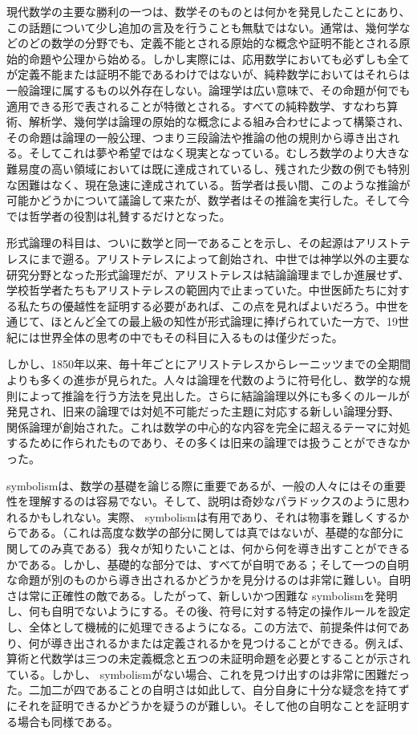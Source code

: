 \documentclass[a4paper,11pt,openany]{ltjsbook}
\begin{document}
現代数学の主要な勝利の一つは、数学そのものとは何かを発見したことにあり、この話題について少し追加の言及を行うことも無駄ではない。通常は、幾何学などのどの数学の分野でも、定義不能とされる原始的な概念や証明不能とされる原始的命題や公理から始める。しかし実際には、応用数学においても必ずしも全てが定義不能または証明不能であるわけではないが、純粋数学においてはそれらは一般論理に属するもの以外存在しない。論理学は広い意味で、その命題が何でも適用できる形で表されることが特徴とされる。すべての純粋数学、すなわち算術、解析学、幾何学は論理の原始的な概念による組み合わせによって構築され、その命題は論理の一般公理、つまり三段論法や推論の他の規則から導き出される。そしてこれは夢や希望ではなく現実となっている。むしろ数学のより大きな難易度の高い領域においては既に達成されているし、残された少数の例でも特別な困難はなく、現在急速に達成されている。哲学者は長い間、このような推論が可能かどうかについて議論して来たが、数学者はその推論を実行した。そして今では哲学者の役割は礼賛するだけとなった。

形式論理の科目は、ついに数学と同一であることを示し、その起源はアリストテレスにまで遡る。アリストテレスによって創始され、中世では神学以外の主要な研究分野となった形式論理だが、アリストテレスは結論論理までしか進展せず、学校哲学者たちもアリストテレスの範囲内で止まっていた。中世医師たちに対する私たちの優越性を証明する必要があれば、この点を見ればよいだろう。中世を通じて、ほとんど全ての最上級の知性が形式論理に捧げられていた一方で、19世紀には世界全体の思考の中でもその科目に入るものは僅少だった。

しかし、1850年以来、毎十年ごとにアリストテレスからレーニッツまでの全期間よりも多くの進歩が見られた。人々は論理を代数のように符号化し、数学的な規則によって推論を行う方法を見出した。さらに結論論理以外にも多くのルールが発見され、旧来の論理では対処不可能だった主題に対応する新しい論理分野、関係論理が創始された。これは数学の中心的な内容を完全に超えるテーマに対処するために作られたものであり、その多くは旧来の論理では扱うことができなかった。

symbolismは、数学の基礎を論じる際に重要であるが、一般の人々にはその重要性を理解するのは容易でない。そして、説明は奇妙なパラドックスのように思われるかもしれない。実際、 symbolismは有用であり、それは物事を難しくするからである。（これは高度な数学の部分に関しては真ではないが、基礎的な部分に関してのみ真である）我々が知りたいことは、何から何を導き出すことができるかである。しかし、基礎的な部分では、すべてが自明である；そして一つの自明な命題が別のものから導き出されるかどうかを見分けるのは非常に難しい。自明さは常に正確性の敵である。したがって、新しいかつ困難な symbolismを発明し、何も自明でないようにする。その後、符号に対する特定の操作ルールを設定し、全体として機械的に処理できるようになる。この方法で、前提条件は何であり、何が導き出されるかまたは定義されるかを見つけることができる。例えば、算術と代数学は三つの未定義概念と五つの未証明命題を必要とすることが示されている。しかし、 symbolismがない場合、これを見つけ出すのは非常に困難だった。二加二が四であることの自明さは如此して、自分自身に十分な疑念を持てずにそれを証明できるかどうかを疑うのが難しい。そして他の自明なことを証明する場合も同様である。
\end{document}
